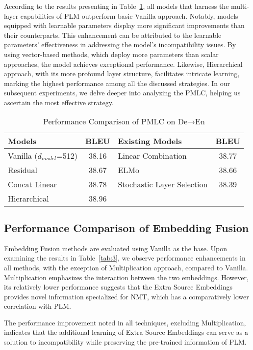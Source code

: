 \documentclass[conference]{IEEEtran}
\begin{document}
According to the results presenting in Table~\ref{tab:2}, all models that harness the multi-layer capabilities of PLM outperform basic Vanilla approach. Notably, models equipped with learnable parameters display more significant improvements than their counterparts. This enhancement can be attributed to the learnable parameters' effectiveness in addressing the model's incompatibility issues. By using vector-based methods, which deploy more parameters than scalar approaches, the model achieves exceptional performance. Likewise, Hierarchical approach, with its more profound layer structure, facilitates intricate learning, marking the highest performance among all the discussed strategies. In our subsequent experiments, we delve deeper into analyzing the PMLC, helping us ascertain the most effective strategy.
\begin{table}[!tb]
    \centering
    \caption{Performance Comparison of PMLC on De→En}
    \label{tab:2}
    \begin{tabular}{|l|c|l|c|}
        \hline
        \textbf{Models} & \textbf{BLEU} & \textbf{Existing Models} & \textbf{BLEU} \\
        \hline
        Vanilla ($d_{model}$=512) & 38.16 & Linear Combination & 38.77 \\
        Residual & 38.67 & ELMo & 38.66 \\
        Concat Linear & 38.78 & Stochastic Layer Selection & 38.39 \\
        Hierarchical & 38.96 & & \\
        \hline
    \end{tabular}
\end{table}


\subsection{Performance Comparison of Embedding Fusion}
Embedding Fusion methods are evaluated using Vanilla as the base. Upon examining the results in Table~\ref{tab:3}, we observe performance enhancements in all methods, with the exception of Multiplication approach, compared to Vanilla. Multiplication emphasizes the interaction between the two embeddings. However, its relatively lower performance suggests that the Extra Source Embeddings provides novel information specialized for NMT, which has a comparatively lower correlation with PLM.

The performance improvement noted in all techniques, excluding Multiplication, indicates that the additional learning of Extra Source Embeddings can serve as a solution to incompatibility while preserving the pre-trained information of PLM.
\end{document}
